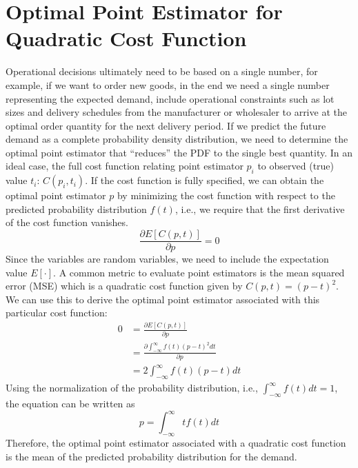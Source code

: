 \documentclass[BCOR=1mm, DIV=calc,10pt,
twoside=true,
twocolumn,
headings=normal]{scrartcl}
\begin{document}





\appendix

\section{Optimal Point Estimator for Quadratic Cost Function}
\label{sec:CostQuantile}

Operational decisions ultimately need to be based on a single number, for example, if we want to order new goods, in the end we need a single number representing the expected demand, include operational constraints such as lot sizes and delivery schedules from the manufacturer or wholesaler to arrive at the optimal order quantity for the next delivery period. If we predict the future demand as a complete probability density distribution, we need to determine the optimal point estimator that ``reduces'' the PDF to the single best quantity. In an ideal case, the full cost function relating point estimator $p_i$ to observed (true) value $t_i$: $C(p_i,t_i)$. If the cost function is fully specified, we can obtain the optimal point estimator $p$ by minimizing the cost function with respect to the predicted probability distribution $f(t)$, i.e., we require that the first derivative of the cost function vanishes.
\begin{equation}
	\frac{\partial E[C(p,t)]}{\partial p} = 0
\end{equation}
Since the variables are random variables, we need to include the expectation value $E[\cdot]$. A common metric to evaluate point estimators is the mean squared error (MSE) which is a quadratic cost function given by $C(p,t) = (p-t)^2$. We can use this to derive the optimal point estimator associated with this particular cost function:
\begin{align*}
0 &= \frac{\partial E[C(p,t)]}{\partial p}   \\
  &= \frac{\partial \int_{-\infty}^\infty  f(t) (p-t)^2 dt}{\partial p}  \\
 &= 2 \int_{-\infty}^\infty  f(t) (p-t) dt
\end{align*}
Using the normalization of the probability distribution, i.e., $\int_{-\infty}^\infty  f(t) dt = 1$, the equation can be written as 
\begin{equation}
p = \int_{-\infty}^\infty  t f(t) dt
\end{equation}
Therefore, the optimal point estimator associated with a quadratic cost function is the mean of the predicted probability distribution for the demand.
\end{document}
